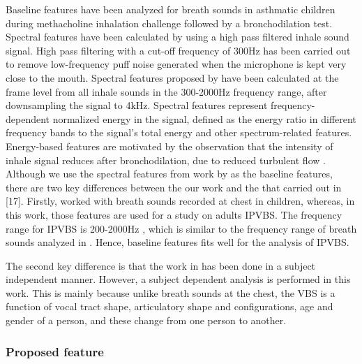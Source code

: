 \documentclass{article}
\begin{document}
Baseline features \cite{tabata2018changes} have been analyzed for breath sounds in asthmatic children during methacholine inhalation challenge followed by a bronchodilation test. Spectral features have been calculated by using a high pass filtered inhale sound signal. High pass filtering with a cut-off frequency of 300Hz has been carried out to remove low-frequency puff noise generated when the microphone is kept very close to the mouth. 
Spectral features proposed by \cite{tabata2018changes} have been calculated at the frame level from all inhale sounds in the 300-2000Hz frequency range, after downsampling the signal to 4kHz. Spectral features represent frequency-dependent normalized energy in the signal, defined as the energy ratio in different frequency bands to the signal's total energy and other spectrum-related features. Energy-based features are motivated by the observation that the intensity of inhale signal reduces after bronchodilation, due to reduced turbulent flow \cite{forgacs1971breath}.\\

Although we use the spectral features from work by \cite{tabata2018changes} as the baseline features, there are two key differences between the our work and the that carried out in [17]. Firstly, \cite{tabata2018changes} worked with breath sounds recorded at chest in children, whereas, in this work, those features are used for a study on adults IPVBS.
The frequency range for IPVBS is 200-2000Hz \cite{sarkar2015auscultation}, which is similar to the frequency range of breath sounds analyzed in \cite{tabata2018changes}. Hence, baseline features fits well for the analysis of IPVBS.




The second key difference is that the work in \cite{tabata2018changes} has been done in a subject independent manner. However, a subject dependent analysis is performed in this work. This is mainly because unlike breath sounds at the chest, the VBS is a function of vocal tract shape, articulatory shape and configurations, age and gender of a person, and these change from one person to another.


\subsubsection{Proposed feature}
\end{document}
